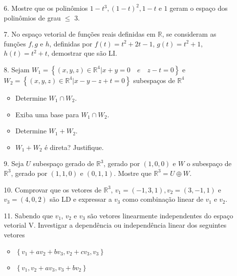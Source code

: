 \begin{itemize}
	\item[6.] Mostre que os polinômios $1-t^{3}, (1-t)^{2},1-t$ e $1$ geram o espaço dos polinômios de grau $\leq$ 3.
\end{itemize}
\begin{itemize}
	\item[7.] No espaço vetorial de funções reais definidas em $\mathbb{R}$, se consideram as funções $f,g$ e $h$, definidas por $f(t)=t^{2}+2t-1$, $g(t)=t^{2}+1$, $h(t)=t^{2}+t$, demostrar que são LI.
	
\end{itemize}
\begin{itemize}
	\item[8.]  Sejam $W_{1}=\left\lbrace (x,y,z)\in \mathbb{R}^{4}| x+y=0\quad e\quad z-t=0 \right\rbrace $ e $W_{2}=\left\lbrace (x,y,z)\in \mathbb{R}^{4}| x-y-z+t=0  \right\rbrace $ subespaços de $\mathbb{R}^{4}$ 
	\begin{itemize}
		\item Determine $W_{1}\cap W_{2}$.
		\item Exiba uma base para $W_{1}\cap W_{2}$.
		\item Determine $W_{1}+W_{2}$.
		\item $W_{1}+W_{2}$ é direta? Justifique.
	\end{itemize}
\end{itemize}
\begin{itemize}
	\item[9.] Seja $U$ subespaço gerado de $\mathbb{R}^{3}$, gerado por $(1,0,0)$ e $W$ o subespaço de $\mathbb{R}^{3}$, gerado por $(1,1,0)$ e $(0,1,1)$. Mostre que $\mathbb{R}^{3}=U\oplus W$. 
\end{itemize}
\begin{itemize}
	\item[10.]Comprovar que os vetores de  $\mathbb{R}^{3}$, $v_{1}=(-1,3,1), v_{2}=(3,-1,1)$ e $v_{3}=(4,0,2)$ são LD e expressar a $v_{3}$ como combinação linear de $v_{1}$ e $v_{2}$. 
\end{itemize}
\begin{itemize}
	\item[11.] Sabendo que $v_{1}$, $v_{2}$ e $v_{3}$ são vetores linearmente independentes do espaço vetorial V. Investigar a dependência ou independência linear dos seguintes vetores
	 \begin{itemize}
	 	\item $\left\lbrace v_{1}+av_{2}+bv_{3}, v_{2}+cv_{3},v_{3}\right\rbrace $
	 	\item $\left\lbrace v_{1}, v_{2}+av_{3},v_{3}+bv_{2}\right\rbrace $
	 \end{itemize}
\end{itemize}
